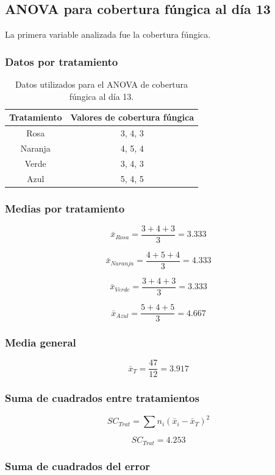 \subsection{ANOVA para cobertura fúngica al día 13}

La primera variable analizada fue la cobertura fúngica.

\subsubsection{Datos por tratamiento}

\begin{table}[H]
\centering
\begin{tabular}{cc}
\hline
Tratamiento & Valores de cobertura fúngica \\
\hline
Rosa & 3, 4, 3 \\
Naranja & 4, 5, 4 \\
Verde & 3, 4, 3 \\
Azul & 5, 4, 5 \\
\hline
\end{tabular}
\caption{Datos utilizados para el ANOVA de cobertura fúngica al día 13.}
\end{table}

\subsubsection{Medias por tratamiento}

\[
\bar{x}_{Rosa}=\frac{3+4+3}{3}=3.333
\]

\[
\bar{x}_{Naranja}=\frac{4+5+4}{3}=4.333
\]

\[
\bar{x}_{Verde}=\frac{3+4+3}{3}=3.333
\]

\[
\bar{x}_{Azul}=\frac{5+4+5}{3}=4.667
\]

\subsubsection{Media general}

\[
\bar{x}_{T}=\frac{47}{12}=3.917
\]

\subsubsection{Suma de cuadrados entre tratamientos}

\[
SC_{Trat}=\sum n_i(\bar{x}_i-\bar{x}_{T})^2
\]

\[
SC_{Trat}=4.253
\]

\subsubsection{Suma de cuadrados del error}

